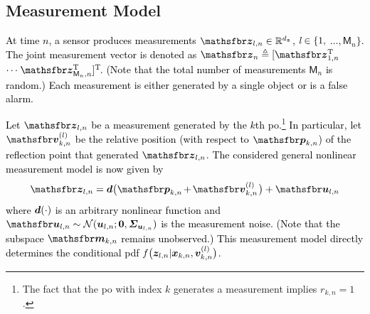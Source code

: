 \documentclass[10pt, twoside, romanappendices]{IEEEtran}
\providecommand{\rd}{\textcolor{black}}
\providecommand{\ist}{\hspace*{.3mm}}
\providecommand{\rmv}{\hspace*{-.3mm}}
\newcommand{\T}{\text{T}}
\begin{document}
\subsection{Measurement Model}
\label{sec:MeasurementModel}

\rd{At time $n$, a sensor produces measurements $\RV{z}_{l,n} \in \mathbb{R}^{d_{\V{z}}}$, $l \rmv\in \{1,$ $\dots,\mathsf{M}_n\}$. The joint measurement vector is denoted as $\RV{z}_n \triangleq [\RV{z}^{\T}_{1,n}$ $\cdots \ist \RV{z}^{\T}_{{\mathsf{M}_n,n}} ]^{\T}\rmv\rmv$.  (Note that the total number of measurements $\mathsf{M}_n$ is random.) Each measurement is either generated by a single object or is a false alarm.}

\rd{Let $\RV{z}_{l,n}$ be a measurement generated by the $k$th \ac{po}.\footnote{The fact that the \ac{po} with index $k$ generates a measurement implies $r_{k,n} \!=\! 1$.} In particular, let $\RV{v}^{(l)}_{k,n}$ be the relative position (with respect to $\RV{p}_{k,n}$) of the reflection point that generated $\RV{z}_{l,n}$. The considered general nonlinear measurement model is now given by
\begin{equation}
\RV{z}_{l,n} = \V{d}\big( \RV{p}_{k,n} \rmv+\rmv \RV{v}^{(l)}_{k,n}  \ist \big) + \RV{u}_{l,n} \label{eq:measModel}
\vspace{.4mm}
\end{equation}
where $\bm{d}(\cdot)$ is an arbitrary nonlinear function and $\RV{u}_{l,n} \sim \mathcal{N}(\V{u}_{l,n} ;\V{0},\M{\Sigma}_{\V{u}_{l,n}})$ is the measurement noise. (Note that the subspace $\RV{m}_{k,n}$ remains unobserved.) This measurement model directly determines the conditional \ac{pdf} $f\big(\bm{z}_{l,n} |\bm{x}_{k,n}, \bm{v}^{(l)}_{k,n}\big)$.}
\end{document}
